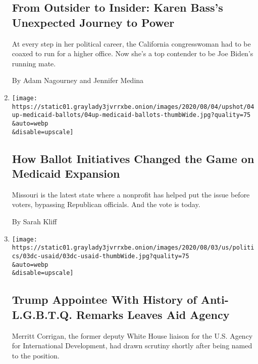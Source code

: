 \begin{enumerate}
  \hypertarget{from-outsider-to-insider-karen-basss-unexpected-journey-to-power-1}{%
  \subsection{From Outsider to Insider: Karen Bass's Unexpected Journey
  to
  Power}\label{from-outsider-to-insider-karen-basss-unexpected-journey-to-power-1}}

  At every step in her political career, the California congresswoman
  had to be coaxed to run for a higher office. Now she's a top contender
  to be Joe Biden's running mate.

  By Adam Nagourney and Jennifer Medina
\item
  \href{/2020/08/04/upshot/missouri-election-medicaid-expansion.html}{}

  \texttt{[image: https://static01.graylady3jvrrxbe.onion/images/2020/08/04/upshot/04up-medicaid-ballots/04up-medicaid-ballots-thumbWide.jpg?quality=75\\\&auto=webp\\\&disable=upscale]}

  \hypertarget{how-ballot-initiatives-changed-the-game-on-medicaid-expansion}{%
  \subsection{How Ballot Initiatives Changed the Game on Medicaid
  Expansion}\label{how-ballot-initiatives-changed-the-game-on-medicaid-expansion}}

  Missouri is the latest state where a nonprofit has helped put the
  issue before voters, bypassing Republican officials. And the vote is
  today.

  By Sarah Kliff
\item
  \href{/2020/08/03/us/politics/merritt-corrigan-usaid.html}{}

  \texttt{[image: https://static01.graylady3jvrrxbe.onion/images/2020/08/03/us/politics/03dc-usaid/03dc-usaid-thumbWide.jpg?quality=75\\\&auto=webp\\\&disable=upscale]}

  \hypertarget{trump-appointee-with-history-of-anti-lgbtq-remarks-leaves-aid-agency}{%
  \subsection{Trump Appointee With History of Anti-L.G.B.T.Q. Remarks
  Leaves Aid
  Agency}\label{trump-appointee-with-history-of-anti-lgbtq-remarks-leaves-aid-agency}}

  Merritt Corrigan, the former deputy White House liaison for the U.S.
  Agency for International Development, had drawn scrutiny shortly after
  being named to the position.


\end{enumerate}
